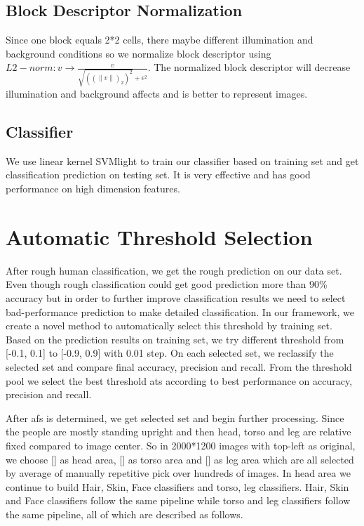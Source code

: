 \documentclass[10pt,twocolumn,letterpaper]{article}
\begin{document}
\subsection{Block Descriptor Normalization}

Since one block equals 2*2 cells, there maybe different illumination and background conditions so we normalize block descriptor using $L2-norm: v\longrightarrow\frac{v}{\sqrt{((\|v\|)_{2})^{2}}+\epsilon^{2}}$. The normalized block descriptor will decrease illumination and background affects and is better to represent images. 

\subsection{Classifier}
We use linear kernel SVMlight to train our classifier based on training set and get classification prediction on testing set. It is very effective and has good performance on high dimension features.

\section{Automatic Threshold Selection}
After rough human classification, we get the rough prediction on our data set. Even though rough classification could get good prediction more than 90\% accuracy but in order to further improve classification results we need to select bad-performance prediction to make detailed classification. In our framework, we create a novel method to automatically select this threshold by training set. Based on the prediction results on training set, we try different threshold from [-0.1, 0.1] to [-0.9, 0.9] with 0.01 step. On each selected set, we reclassify the selected set and compare final accuracy, precision and recall. From the threshold pool we select the best threshold ats according to best performance on accuracy, precision and recall. 

After afs is determined, we get selected set and begin further processing. Since the people are mostly standing upright and then head, torso and leg are relative fixed compared to image center. So in 2000*1200 images with top-left as original, we choose [] as head area, [] as torso area and [] as leg area which are all selected by average of manually repetitive pick over hundreds of images. In head area we continue to build Hair, Skin, Face classifiers and torso, leg classifiers. Hair, Skin and Face classifiers follow the same pipeline while torso and leg classifiers follow the same pipeline, all of which are described as follows.
\end{document}
